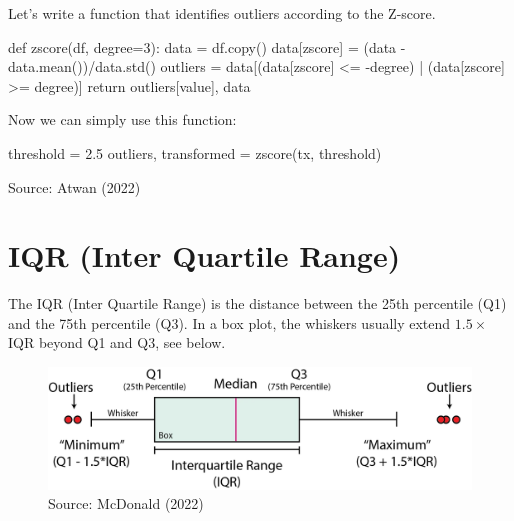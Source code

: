 \documentclass[
  letterpaper,
  DIV=11,
  numbers=noendperiod,
  oneside]{scrreprt}
\newenvironment{Shaded}{\begin{snugshade}}{\end{snugshade}}
\newcommand{\ControlFlowTok}[1]{\textcolor[rgb]{0.00,0.23,0.31}{#1}}
\newcommand{\DecValTok}[1]{\textcolor[rgb]{0.68,0.00,0.00}{#1}}
\newcommand{\FloatTok}[1]{\textcolor[rgb]{0.68,0.00,0.00}{#1}}
\newcommand{\KeywordTok}[1]{\textcolor[rgb]{0.00,0.23,0.31}{#1}}
\newcommand{\NormalTok}[1]{\textcolor[rgb]{0.00,0.23,0.31}{#1}}
\newcommand{\OperatorTok}[1]{\textcolor[rgb]{0.37,0.37,0.37}{#1}}
\newcommand{\StringTok}[1]{\textcolor[rgb]{0.13,0.47,0.30}{#1}}
\begin{document}
Let's write a function that identifies outliers according to the
Z-score.

\begin{Shaded}
\begin{Highlighting}[]
\KeywordTok{def}\NormalTok{ zscore(df, degree}\OperatorTok{=}\DecValTok{3}\NormalTok{):}
\NormalTok{    data }\OperatorTok{=}\NormalTok{ df.copy()}
\NormalTok{    data[}\StringTok{\textquotesingle{}zscore\textquotesingle{}}\NormalTok{] }\OperatorTok{=}\NormalTok{ (data }\OperatorTok{{-}}\NormalTok{ data.mean())}\OperatorTok{/}\NormalTok{data.std()}
\NormalTok{    outliers }\OperatorTok{=}\NormalTok{ data[(data[}\StringTok{\textquotesingle{}zscore\textquotesingle{}}\NormalTok{] }\OperatorTok{\textless{}=} \OperatorTok{{-}}\NormalTok{degree) }\OperatorTok{|}\NormalTok{ (data[}\StringTok{\textquotesingle{}zscore\textquotesingle{}}\NormalTok{] }\OperatorTok{\textgreater{}=}\NormalTok{ degree)]}
    \ControlFlowTok{return}\NormalTok{ outliers[}\StringTok{\textquotesingle{}value\textquotesingle{}}\NormalTok{], data}
\end{Highlighting}
\end{Shaded}

Now we can simply use this function:

\begin{Shaded}
\begin{Highlighting}[]
\NormalTok{threshold }\OperatorTok{=} \FloatTok{2.5}
\NormalTok{outliers, transformed }\OperatorTok{=}\NormalTok{ zscore(tx, threshold)}
\end{Highlighting}
\end{Shaded}

Source: Atwan (2022)

\hypertarget{iqr-inter-quartile-range}{%
\chapter{IQR (Inter Quartile Range)}\label{iqr-inter-quartile-range}}

The IQR (Inter Quartile Range) is the distance between the 25th
percentile (Q1) and the 75th percentile (Q3). In a box plot, the
whiskers usually extend \(1.5\times\)IQR beyond Q1 and Q3, see below.

\begin{figure}

{\centering \includegraphics{outliers/iqr1.png}

}

\caption{Source: McDonald (2022)}

\end{figure}
\end{document}
